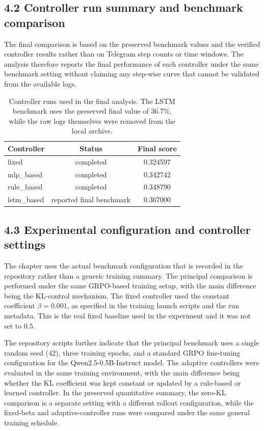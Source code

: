 \documentclass{article}
\begin{document}
\subsection*{4.2 Controller run summary and benchmark comparison}
The final comparison is based on the preserved benchmark values and the verified controller results rather than on Telegram step counts or time windows. The analysis therefore reports the final performance of each controller under the same benchmark setting without claiming any step-wise curve that cannot be validated from the available logs.

\begin{table}[ht]
\centering
\caption{Controller runs used in the final analysis. The LSTM benchmark uses the preserved final value of 36.7\%, while the raw logs themselves were removed from the local archive.}
\begin{tabular}{l c c}
\toprule
Controller & Status & Final score \\ \midrule
fixed & completed & 0.324597 \\ 
mlp\_based & completed & 0.342742 \\ 
rule\_based & completed & 0.348790 \\ 
lstm\_based & reported final benchmark & 0.367000 \\ 
\bottomrule
\end{tabular}
\end{table}

\subsection*{4.3 Experimental configuration and controller settings}
The chapter uses the actual benchmark configuration that is recorded in the repository rather than a generic training summary. The principal comparison is performed under the same GRPO-based training setup, with the main difference being the KL-control mechanism. The fixed controller used the constant coefficient $\beta = 0.001$, as specified in the training launch scripts and the run metadata. This is the real fixed baseline used in the experiment and it was not set to $0.5$.

The repository scripts further indicate that the principal benchmark uses a single random seed (42), three training epochs, and a standard GRPO fine-tuning configuration for the Qwen2.5-0.5B-Instruct model. The adaptive controllers were evaluated in the same training environment, with the main difference being whether the KL coefficient was kept constant or updated by a rule-based or learned controller. In the preserved quantitative summary, the zero-KL comparison is a separate setting with a different rollout configuration, while the fixed-beta and adaptive-controller runs were compared under the same general training schedule.
\end{document}
